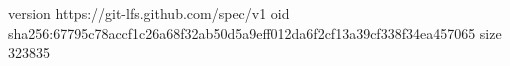 version https://git-lfs.github.com/spec/v1
oid sha256:67795c78accf1c26a68f32ab50d5a9eff012da6f2cf13a39cf338f34ea457065
size 323835
